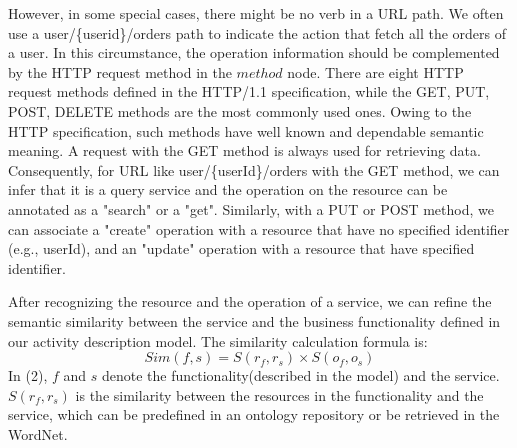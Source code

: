 However, in some special cases, there might be no verb in a URL path. We often use a user/\{userid\}/orders  path to indicate the action that fetch all the orders of a user. In this circumstance, the operation information should be complemented by the HTTP request method in the $method$ node. There are eight HTTP request methods defined in the HTTP/1.1 specification, while the GET, PUT, POST, DELETE methods are the most commonly used ones. Owing to the HTTP specification, such methods have well known and dependable semantic meaning. A request with the GET method is always used for retrieving data. Consequently, for URL like user/\{userId\}/orders with the GET method, we can infer that it is a query service and the operation on the resource can be annotated as a "search" or a "get". Similarly, with a PUT or POST method, we can associate a "create" operation with a resource that have no specified identifier (e.g., userId), and an "update" operation with a resource that have specified identifier. 

After recognizing the resource and the operation of a service, we can refine the semantic similarity between the service and the business functionality defined in our activity description model. The similarity calculation formula is:
\begin{equation}
	Sim(f,s) = S(r_f,r_s) \times S(o_f,o_s)
\end{equation}
In (2), $f$ and $s$ denote the functionality(described in the model) and the service. $S(r_f,r_s)$ is the similarity between the resources in the functionality and the service, which can be predefined in an ontology repository or be retrieved in the WordNet\cite{wordnet}. 

